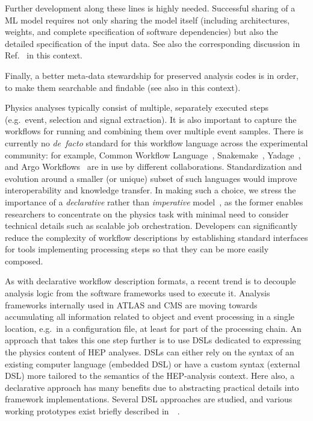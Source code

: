 \documentclass[11pt]{article}
\begin{document}
Further development along these lines is highly needed. Successful sharing of a \gls{ML} model requires not only sharing the model itself (including architectures, weights, and complete specification of software dependencies) but also the detailed specification of the input data. See also the corresponding discussion in Ref.~\cite{snowmass:MLevts} in this context.

Finally, a better meta-data stewardship for preserved analysis codes is in order, to make them searchable and findable (see also  in this context).


Physics analyses typically consist of multiple, separately executed steps (e.g.~event, selection and signal extraction). It is also important to capture the workflows for running and combining them over multiple event samples. There is currently no \emph{de~facto} standard for this workflow language across the experimental community: for example, Common Workflow Language~\cite{CWL}, Snakemake~\cite{SnakeMake}, Yadage~\cite{Cranmer:2017frf,yadage_code}, and Argo Workflows~\cite{argo} are in use by different collaborations. Standardization and evolution around a smaller (or unique) subset of such languages would improve interoperability and knowledge transfer. In making such a choice, we stress the importance of a \textsl{declarative} rather than \textsl{imperative} model~\cite{10.3389/fdata.2021.661501}, as the former enables researchers to concentrate on the physics task with minimal need to consider technical details such as scalable job orchestration. Developers can significantly reduce the complexity of workflow descriptions by establishing standard interfaces for tools implementing processing steps so that they can be more easily composed.

As with declarative workflow description formats, a recent trend is to decouple analysis logic from the software frameworks used to execute it. Analysis frameworks internally used in \gls{ATLAS} and \gls{CMS}
are moving towards accumulating all information related to object and event processing in a single location, e.g.~in a configuration file, at least for part of the processing chain. An approach that takes this one step further is to use \glspl{DSL} dedicated to expressing the physics content of \gls{HEP} analyses. \glspl{DSL} can either rely on the syntax of an existing computer language (embedded \gls{DSL}) or have a custom syntax (external \gls{DSL}) more tailored to the semantics of the \gls{HEP}-analysis context. Here also, a declarative approach has many benefits due to abstracting practical details into framework implementations. Several \gls{DSL} approaches are studied, and various working prototypes exist briefly described in~~\cite{Sekmen:2020vph}.
\end{document}
